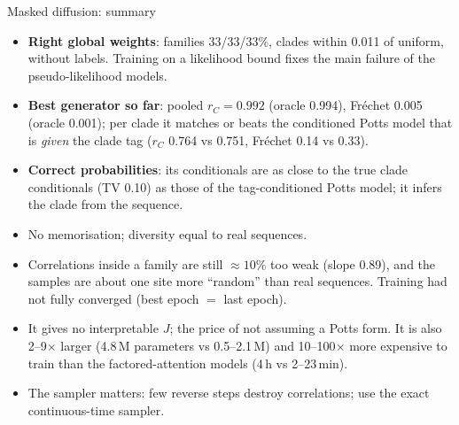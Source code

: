 \begin{keybox}{Masked diffusion: summary}
\begin{itemize}[nosep]
\item[+] \textbf{Right global weights}: families 33/33/33\%, clades within 0.011 of uniform, without labels. Training on a
      likelihood bound fixes the main failure of the pseudo-likelihood models.
\item[+] \textbf{Best generator so far}: pooled $r_C=0.992$ (oracle 0.994), Fréchet 0.005 (oracle 0.001); per clade it matches or beats
      the conditioned Potts model that is \emph{given} the clade tag ($r_C$ 0.764 vs 0.751, Fréchet 0.14 vs 0.33).
\item[+] \textbf{Correct probabilities}: its conditionals are as close to the true clade conditionals (TV 0.10) as those of the
      tag-conditioned Potts model; it infers the clade from the sequence.
\item[+] No memorisation; diversity equal to real sequences.
\item[--] Correlations inside a family are still $\approx10\%$ too weak (slope 0.89), and the samples are about one site more
      ``random'' than real sequences. Training had not fully converged (best epoch $=$ last epoch).
\item[--] It gives no interpretable $J$; the price of not assuming a Potts form. It is also 2--9$\times$ larger (4.8\,M parameters vs 0.5--2.1\,M)
      and 10--100$\times$ more expensive to train than the factored-attention models (4\,h vs 2--23\,min).
\item[!] The sampler matters: few reverse steps destroy correlations; use the exact continuous-time sampler.
\end{itemize}
\end{keybox}

